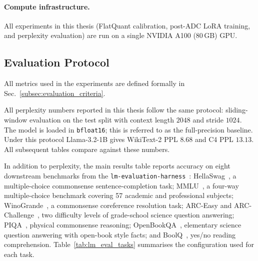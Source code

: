 \documentclass[a4paper,11pt,oneside]{article}
\theoremstyle{breakstyle}
\begin{document}
  \paragraph{Compute infrastructure.}
  All experiments in this thesis (FlatQuant calibration, post-ADC LoRA
  training, and perplexity evaluation) are run on a single NVIDIA
  A100 (80\,GB) GPU.

\subsection{Evaluation Protocol}
  \label{sec:eval_protocol}

  All metrics used in the experiments are defined formally in
  Sec.~\ref{subsec:evaluation_criteria}.

  All perplexity numbers reported in this thesis follow the same
  protocol: sliding-window evaluation on the test split with context
  length $2048$ and stride $1024$.  The model is loaded in
  \texttt{bfloat16}; this is referred to as the full-precision baseline.
  Under this protocol Llama-3.2-1B gives WikiText-2 PPL $8.68$ and
  C4 PPL $13.13$.  All subsequent tables compare against these
  numbers.

  In addition to perplexity, the main results table reports accuracy
  on eight downstream benchmarks from the
  \texttt{lm-evaluation-harness}~\cite{lmevalharness}:
  HellaSwag~\cite{hellaswag}, a multiple-choice commonsense
  sentence-completion task; MMLU~\cite{mmlu}, a four-way
  multiple-choice benchmark covering 57 academic and professional
  subjects; WinoGrande~\cite{winogrande}, a commonsense coreference
  resolution task; ARC-Easy and ARC-Challenge~\cite{arc}, two
  difficulty levels of grade-school science question answering;
  PIQA~\cite{piqa}, physical commonsense reasoning;
  OpenBookQA~\cite{openbookqa}, elementary science question
  answering with open-book style facts; and BoolQ~\cite{boolq},
  yes/no reading comprehension.  Table~\ref{tab:lm_eval_tasks}
  summarises the configuration used for each task.
\end{document}

